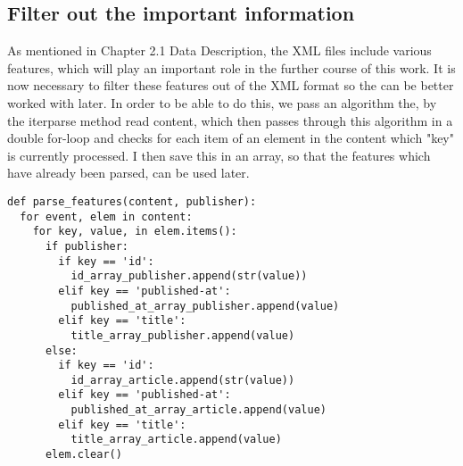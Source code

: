 \documentclass[a4paper, 11pt,titlepage,oneside,openany]{book}
\begin{document}
\subsection{Filter out the important information}
As mentioned in Chapter 2.1 Data Description, the XML files include various features, which will play an important role in the further course of this work. It is now necessary to filter these features out of the XML format so the can be better worked with later. In order to be able to do this, we pass an algorithm the, by the iterparse method read content, which then passes through this algorithm in a double for-loop and checks for each item of an element in the content which "key" is currently processed. I then save this in an array, so that the features which have already been parsed, can be used later. \\
\noindent
\begin{minipage}{\linewidth}
		\begin{lstlisting}[frame=single]
def parse_features(content, publisher):
  for event, elem in content:
    for key, value, in elem.items():
      if publisher:
        if key == 'id':
          id_array_publisher.append(str(value))
        elif key == 'published-at':
          published_at_array_publisher.append(value)
        elif key == 'title':
          title_array_publisher.append(value)
      else:
        if key == 'id':
          id_array_article.append(str(value))
        elif key == 'published-at':
          published_at_array_article.append(value)
        elif key == 'title':
          title_array_article.append(value)
      elem.clear()
		\end{lstlisting}
\end{minipage}
\end{document}
